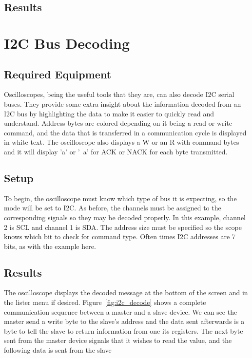 \documentclass{article}
\begin{document}
  \subsection{Results}

  \section{I2C Bus Decoding}

  \subsection{Required Equipment}

  Oscilloscopes, being the useful tools that they are, can also decode I2C
  serial buses. They provide some extra insight about the information decoded
  from an I2C bus by highlighting the data to make it easier to quickly read and
  understand. Address bytes are colored depending on it being a read or write
  command, and the data that is transferred in a communication cycle is
  displayed in white text. The oscilloscope also displays a W or an R with
  command bytes and it will display 'a' or '~a' for ACK or NACK for each byte
  transmitted.

  \subsection{Setup}

  To begin, the oscilloscope must know which type of bus it is expecting, so the
  mode will be set to I2C. As before, the channels must be assigned to the
  corresponding signals so they may be decoded properly. In this example,
  channel 2 is SCL and channel 1 is SDA. The address size must be specified so
  the scope knows which bit to check for command type. Often times I2C addresses
  are 7 bits, as with the example here.

  \subsection{Results}

  The oscilloscope displays the decoded message at the bottom of the screen and
  in the lister menu if desired. Figure~\ref{fig:i2c_decode} shows a complete
  communication sequence between a master and a slave device. We can see the
  master send a write byte to the slave's address and the data sent afterwards
  is a byte to tell the slave to return information from one its registers. The
  next byte sent from the master device signals that it wishes to read the
  value, and the following data is sent from the slave
\end{document}
